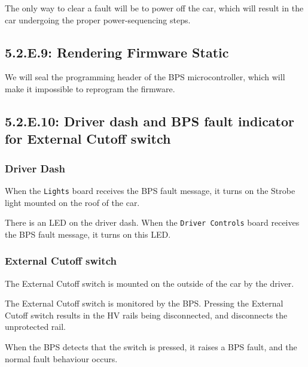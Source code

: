\documentclass[10pt]{article}
\begin{document}
The only way to clear a fault will be to power off the car, which will result
in the car undergoing the proper power-sequencing steps.

\subsection{5.2.E.9: Rendering Firmware Static}

We will seal the programming header of the BPS microcontroller, which will
make it impossible to reprogram the firmware.

\subsection{5.2.E.10: Driver dash and BPS fault indicator for External Cutoff switch}

\subsubsection{Driver Dash}

When the \texttt{Lights} board receives the BPS fault message, it turns on the
Strobe light mounted on the roof of the car.

There is an LED on the driver dash. When the \texttt{Driver Controls} board
receives the BPS fault message, it turns on this LED.

\subsubsection{External Cutoff switch}

The External Cutoff switch is mounted on the outside of the car by the driver.

The External Cutoff switch is monitored by the BPS. Pressing the External
Cutoff switch results in the HV rails being disconnected, and disconnects the
unprotected rail.

When the BPS detects that the switch is pressed, it raises a BPS fault, and
the normal fault behaviour occurs.


\pagebreak
\appendix
\end{document}
